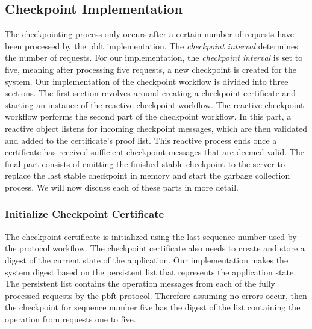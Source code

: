 \iffalse
\subsection{Checkpoint Implementation}
\label{section:ImpCheckpointing}
The checkpointing process only occurs after a certain number of requests have been processed by the \ac{pbft} implementation. The \emph{checkpoint interval} determines the number of requests.
For our implementation, the \emph{checkpoint interval} is set to five, meaning after processing five requests, a new checkpoint is created for the system. Our implementation of the checkpoint workflow is divided into three sections. The first section revolves around creating a checkpoint certificate and starting an instance of the reactive checkpoint workflow. The reactive checkpoint workflow performs the second part of the checkpoint workflow. In this part, a reactive  object listens for incoming checkpoint messages, which are then validated and added to the certificate’s proof list. This reactive process ends once a certificate has received sufficient checkpoint messages that are deemed valid. The final part consists of emitting the finished stable checkpoint to the server to replace the last stable checkpoint in memory and start the garbage collection process. We will now discuss each of these parts in more detail.

\subsubsection{Initialize Checkpoint Certificate}
The checkpoint certificate is initialized using the last sequence number used by the protocol workflow. The checkpoint certificate also needs to create and store a digest of the current state of the application. Our implementation makes the system digest based on the persistent list that represents the application state. The persistent list contains the operation messages from each of the fully processed requests by the \ac{pbft} protocol. Therefore assuming no errors occur, then the checkpoint for sequence number five has the digest of the list containing the operation from requests one to five. 

